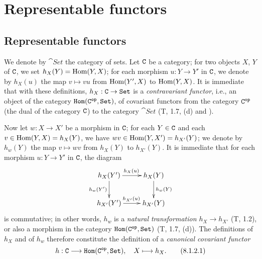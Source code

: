 \section{Representable functors}
\label{section-representable-functors}

\subsection{Representable functors}
\label{subsection-representable-functors}

\begin{env}[8.1.1]
\label{env-0.8.1.1}
We denote by $\cat{Set}$ the category of sets. Let $\mathtt{C}$ be a category; for two objects
$X$, $Y$ of $\mathtt{C}$, we set $h_X(Y)={\mathop{\mathrm{Hom}}\nolimits}(Y,X)$; for each morphism $u:Y\to Y'$ in $\mathtt{C}$, we
denote by $h_X(u)$ the map $v\mapsto vu$ from ${\mathop{\mathrm{Hom}}\nolimits}(Y',X)$ to ${\mathop{\mathrm{Hom}}\nolimits}(Y,X)$. It is immediate
that with these definitions, $h_X:\mathtt{C}\to\mathtt{Set}$ is a {\em contravariant functor}, i.e., an
object of the category $\mathtt{Hom}(\mathtt{C}^\mathtt{op},\mathtt{Set})$, of covariant functors from the
category $\mathtt{C}^\mathtt{op}$ (the dual of the category $\mathtt{C}$) to the category $\cat{Set}$ (T, 1.7, (d) and
).
\end{env}

\begin{env}[8.1.2]
\label{env-0.8.1.2}
Now let $w:X\to X'$ be a morphism in $\mathtt{C}$; for each $Y\in\mathtt{C}$ and each $v\in{\mathop{\mathrm{Hom}}\nolimits}(Y,X)=h_X(Y)$,
we have $wv\in{\mathop{\mathrm{Hom}}\nolimits}(Y,X')=h_{X'}(Y)$; we denote by $h_w(Y)$ the map $v\mapsto wv$ from
$h_X(Y)$ to $h_{X'}(Y)$. It is immediate that for each morphism $u:Y\to Y'$ in $\mathtt{C}$, the
diagram
\[
  \xymatrix{
    h_X(Y')\ar[r]^{h_X(u)}\ar[d]_{h_w(Y')} &
    h_X(Y)\ar[d]^{h_w(Y)}\\
    h_{X'}(Y')\ar[r]^{h_{X'}(u)} &
    h_{X'}(Y)
  }
\]
is commutative; in other words, $h_w$ is a {\em natural transformation $h_X\to h_{X'}$}
(T, 1.2), or also a morphism in the category $\mathtt{Hom}(\mathtt{C}^\mathtt{op},\mathtt{Set})$ (T, 1.7, (d)). The
definitions of $h_X$ and of $h_w$ therefore constitute the definition of a {\em canonical
covariant functor}
\[
  h:\mathtt{C}\longrightarrow\mathtt{Hom}(\mathtt{C}^\mathtt{op},\mathtt{Set}),\quad X\longmapsto h_X.
  \tag{8.1.2.1}
\]
\end{env}

